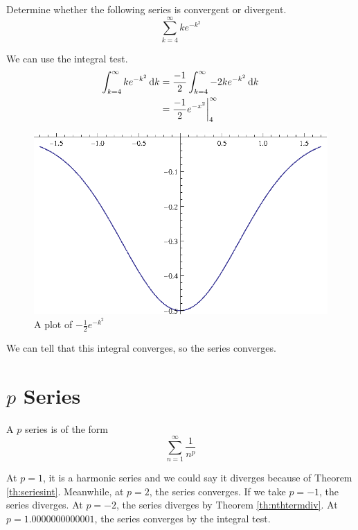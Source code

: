 \begin{ex}
  Determine whether the following series is convergent or divergent.
  \[ \sum_{k=4}^\infty k e^{-k^2} \]
  \begin{sol}
    We can use the integral test.
    \begin{align*}
      \int_{k=4}^\infty k e^{-k^2} \,\mathrm{d} k
      &=\frac{-1}{2}\int_{k=4}^\infty -2 k e^{-k^2} \,\mathrm{d} k \\
      &=\frac{-1}{2}e^{-x^2} \bigg|_4^\infty
    \end{align*}
    \begin{figure}[H]
      \begin{center}
        \includegraphics[scale=0.8]{continuous/series/henxs}
      \end{center}
      \caption{A plot of $-\frac{1}{2}e^{-k^2}$}
      \label{fig:henxs}
    \end{figure}
    We can tell that this integral converges, so the series converges.
  \end{sol}
\end{ex}

\section{$p$ Series}
\label{sec:pseries}

A \(p\) series is of the form
\[ \sum_{n=1}^{\infty} \frac{1}{n^p} \]

At \(p=1\), it is a harmonic series and we could say it diverges because of Theorem \ref{th:seriesint}.
Meanwhile, at \(p=2\), the series converges.
If we take \(p=-1\), the series diverges.
At \(p=-2\), the series diverges by Theorem \ref{th:nthtermdiv}.
At \(p=1.0000000000001\), the series converges by the integral test.

